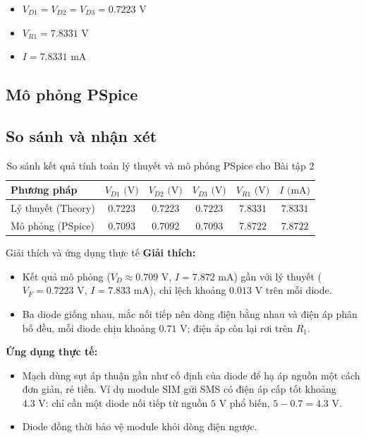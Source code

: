 \begin{dapsobox}
  \begin{itemize}[leftmargin=1.5em]
    \item $V_{D1} = V_{D2} = V_{D3} = 0.7223\text{ V}$
    \item $V_{R1} = 7.8331\text{ V}$
    \item $I = 7.8331\text{ mA}$
  \end{itemize}
\end{dapsobox}

\Needspace{0.66\textheight}
\subsection{Mô phỏng PSpice}
\simresult
{}

\subsection{So sánh và nhận xét}
\begin{table}[H]
  \centering
  \caption{So sánh kết quả tính toán lý thuyết và mô phỏng PSpice cho Bài tập 2}
  \begin{tabular}{lccccc}
    \toprule
    \textbf{Phương pháp} & $V_{D1}\text{ (V)}$ & $V_{D2}\text{ (V)}$ & $V_{D3}\text{ (V)}$ & $V_{R1}\text{ (V)}$ & $I\text{ (mA)}$ \\
    \midrule
    Lý thuyết (Theory)  & $0.7223$ & $0.7223$ & $0.7223$ & $7.8331$ & $7.8331$ \\
    Mô phỏng (PSpice)   & $0.7093$ & $0.7092$ & $0.7093$ & $7.8722$ & $7.8722$ \\
    \bottomrule
  \end{tabular}
\end{table}

\begin{notebox}{Giải thích và ứng dụng thực tế}
\textbf{Giải thích:}
\begin{itemize}[leftmargin=1.5em,itemsep=2pt,topsep=2pt]
  \item Kết quả mô phỏng ($V_D \approx 0.709\text{ V}$, $I = 7.872\text{ mA}$) gần với lý thuyết ($V_F = 0.7223\text{ V}$, $I = 7.833\text{ mA}$), chỉ lệch khoảng $0.013\text{ V}$ trên mỗi diode.
  \item Ba diode giống nhau, mắc nối tiếp nên dòng điện bằng nhau và điện áp phân bố đều, mỗi diode chịu khoảng $0.71\text{ V}$; điện áp còn lại rơi trên $R_1$.
\end{itemize}
\textbf{Ứng dụng thực tế:}
\begin{itemize}[leftmargin=1.5em,itemsep=2pt,topsep=2pt]
  \item Mạch dùng sụt áp thuận gần như cố định của diode để hạ áp nguồn một cách đơn giản, rẻ tiền. Ví dụ module SIM gửi SMS có điện áp cấp tốt khoảng $4.3\text{ V}$: chỉ cần một diode nối tiếp từ nguồn $5\text{ V}$ phổ biến, $5 - 0.7 = 4.3\text{ V}$.
  \item Diode đồng thời bảo vệ module khỏi dòng điện ngược.
\end{itemize}
\end{notebox}
